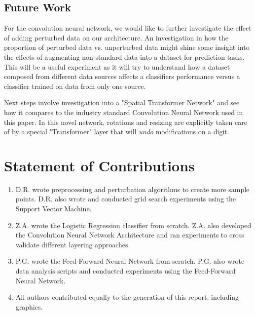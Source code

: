 \documentclass[conference]{IEEEtran}
\begin{document}
\subsection{Future Work}

For the convolution neural network, we would like to further investigate the effect of adding perturbed data on our architecture. An investigation in how the proportion of perturbed data vs. unperturbed data might shine some insight into the effects of augmenting non-standard data into a dataset for prediction tasks. This will be a useful experiment as it will try to understand how a dataset composed from different data sources affects a classifiers performance versus a classifier trained on data from only one source.

Next steps involve investigation into a "Spatial Transformer Network" \cite{STN} and see how it compares to the industry standard Convolution Neural Network used in this paper. In this novel network, rotations and resizing are explicitly taken care of by a special "Transformer" layer that will \emph{undo} modifications on a digit. 


\section{Statement of Contributions}

\begin{enumerate}
\item D.R. wrote preprocessing and perturbation algorithms to create more sample points. D.R. also wrote and conducted grid search experiments using the Support Vector Machine.
\item Z.A. wrote the Logistic Regression classifier from scratch. Z.A. also developed the Convolution Neural Network Architecture and ran experiments to cross validate different layering approaches.
\item P.G. wrote the Feed-Forward Neural Network from scratch. P.G. also wrote data analysis scripts and conducted experiments using the Feed-Forward Neural Network.
\item All authors contributed equally to the generation of this report, including graphics.
\end{enumerate}
\end{document}
